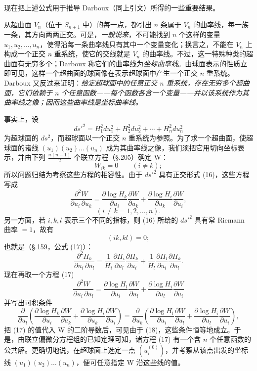 现在把上述公式用于推导 Darboux（同上引文）所得的一些重要结果。

从超曲面 $V_n$（位于 $S_{n+1}$ 中）的每一点，都引出 $n$ 条属于 $V_n$ 的曲率线，每一族一条，其方向两两正交。可是，\emph{一般说来}，不可能找到 $n$ 个这样的变量 $u_1,u_2,\ldots,u_n$，使得沿每一条曲率线只有其中一个变量变化；换言之，不能在 $V_n$ 上构成一个正交 $n$ 重系统，使它的交线就是 $V_n$ 的曲率线。不过，这一特殊种类的超曲面有无穷多个；Darboux 称它们的曲率线为\emph{坐标曲率线}。由球面表示的性质立即可见，这样一个超曲面的球面像在表示超球面中产生一个正交 $n$ 重系统。Darboux 又反过来证明：\emph{给定超球面中的任意正交 $n$ 重系统，存在无穷多个超曲面，它们依赖于 $n$ 个任意函数——每个函数各含一个变量——并以该系统作为其曲率线之像；因而这些曲率线是坐标曲率线。}

事实上，设
\[
\tag{16}
ds'^2=H_1^2du_1^2+H_2^2du_2^2+\cdots+H_n^2du_n^2
\]
为超球面的 $ds^2$，而超球面以一个正交 $n$ 重系统为参照。为了求一个超曲面，使超球面的诸线 $(u_1)(u_2)\ldots(u_n)$ 成为其曲率线之像，我们须把它用切向坐标表示，并由下列 $\frac{n(n-1)}2$ 个联立方程（\S.205）确定 W：
\[
W_{ik}=0\qquad(i\ne k);
\]
所以问题归结为考察这些方程的相容性。由于 $ds'^2$ 具有正交形式 (16)，这些方程写成
\[
\tag{17}
\frac{\partial^2W}{\partial u_i\,\partial u_k}
=\frac{\partial\log H_k}{\partial u_i}\frac{\partial W}{\partial u_k}
+\frac{\partial\log H_i}{\partial u_k}\frac{\partial W}{\partial u_i},
\]
\[
(i\ne k=1,2,\ldots,n).
\]
另一方面，若 $i,k,l$ 表示三个不同的指标，则 (16) 所给的 $ds'^2$ 具有常 Riemann 曲率 $=1$，故有
\[
(ik,kl)=0;
\]
也就是（\S.159，公式 (17)）：
\[
\tag{18}
\frac{\partial^2H_k}{\partial u_i\,\partial u_l}
=\frac1{H_i}\frac{\partial H_i}{\partial u_l}\frac{\partial H_k}{\partial u_i}
+\frac1{H_l}\frac{\partial H_l}{\partial u_i}\frac{\partial H_k}{\partial u_l}.
\]
现在再取一个方程 (17)
\[
\frac{\partial^2W}{\partial u_i\,\partial u_l}
=\frac{\partial\log H_l}{\partial u_i}\frac{\partial W}{\partial u_l}
+\frac{\partial\log H_i}{\partial u_l}\frac{\partial W}{\partial u_i}
\]
并写出可积条件
\[
\frac{\partial}{\partial u_l}\left(
\frac{\partial\log H_k}{\partial u_i}\frac{\partial W}{\partial u_k}
+\frac{\partial\log H_i}{\partial u_k}\frac{\partial W}{\partial u_i}\right)
=
\frac{\partial}{\partial u_k}\left(
\frac{\partial\log H_l}{\partial u_i}\frac{\partial W}{\partial u_l}
+\frac{\partial\log H_i}{\partial u_l}\frac{\partial W}{\partial u_i}\right),
\]
把 (17) 的值代入 W 的二阶导数后，可见由于 (18)，这些条件恒等地成立。于是，由联立偏微分方程组的已知定理可知，诸方程 (17) 有一个含 $n$ 个任意函数的公共解。更确切地说，在超球面上选定一点 $(u_i^{(0)})$，并考察从该点出发的坐标线 $(u_1)(u_2)\ldots(u_n)$，便可任意指定 W 沿这些线的值。

